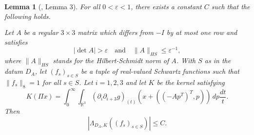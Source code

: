 \documentclass[12pt,reqno]{amsart}
\theoremstyle{plain}
\newtheorem{lemma}[theorem]{Lemma}
\theoremstyle{definition}
\numberwithin{equation}{section}
\newcommand{\R}{{\mathbb R}}
\begin{document}
\begin{lemma}[\cite{MR4171366}, Lemma 3]\label{L:lemmaDT}
For all $0<\varepsilon<1$, there exists a constant $C$ such that the following holds.

Let $A$ be a regular $3 \times 3$ matrix which differs from $-I$ by at most one row and   satisfies
\begin{equation}\label{E:assumption-A}
|\operatorname{det}A| >\varepsilon \quad \text{and} \quad
\|A\|_{HS} \leq \varepsilon^{-1},
\end{equation}
where $\|A\|_{HS}$ stands for the Hilbert-Schmidt norm of $A$. With $S$ as in the datum $D_A$, let $(f_s)_{s\in S}$ be a tuple of real-valued Schwartz functions such that $\|f_s\|_8=1$ for all $s\in S$. Let $i=1,2,3$ and let $K$ be the kernel satisfying
\begin{equation}\label{E:k-rewritten}
K(\Pi x)=
\int_0^\infty \int_{\R^3} (\partial_i\partial_{i+3} g)_{(t)}(x+((-Ap^T)^T,p))\,dp \frac{dt}{t}.
\end{equation} 
Then
\[
|\Lambda_{D_A,K}((f_s)_{s\in S})| \leq C. 
\]
\end{lemma}

 
\end{document}
